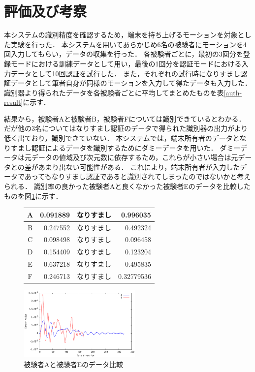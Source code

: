 \section{評価及び考察}
本システムの識別精度を確認するため，端末を持ち上げるモーションを対象とした実験を行った．
本システムを用いてあらかじめ6名の被験者にモーションを4回入力してもらい，データの収集を行った．
各被験者ごとに，最初の3回分を登録モードにおける訓練データとして用い，最後の1回分を認証モードにおける入力データとして10回認証を試行した．
また，それぞれの試行時になりすまし認証データとして筆者自身が同様のモーションを入力して得たデータも入力した．
識別器より得られたデータを各被験者ごとに平均してまとめたものを表\ref{auth-result}に示す．

結果から，被験者Aと被験者B，被験者Fについては識別できているとわかる．
だが他の3名についてはなりすまし認証のデータで得られた識別器の出力がより低く出ており，識別できていない．
本システムでは，端末所有者のデータとなりすまし認証によるデータを識別するためにダミーデータを用いた．
ダミーデータは元データの値域及び次元数に依存するため，これらが小さい場合は元データとの差があまり出ない可能性がある．
これにより，端末所有者が入力したデータであってもなりすまし認証であると識別されてしまったのではないかと考えられる．
識別率の良かった被験者Aと良くなかった被験者Eのデータを比較したものを図\ref{compare}に示す．

\begin{figure}[!tb]
  \def\@captype{table}
  \begin{minipage}{.48\textwidth}
    \centering
    \label{auth-result}
    \begin{tabular}{|c|r||c|r|} \hline
      A & 0.091889 & なりすまし & 0.996035 \\ \hline
      B & 0.247552 & なりすまし & 0.492324 \\ \hline
      C & 0.098498 & なりすまし & 0.096458 \\ \hline
      D & 0.154409 & なりすまし & 0.123204 \\ \hline
      E & 0.637218 & なりすまし & 0.495835 \\ \hline
      F & 0.246713 & なりすまし & 0.32779536 \\ \hline
    \end{tabular}
  \end{minipage}
  \hfill
  \begin{minipage}{.48\textwidth}
    \centering
    \includegraphics[bb=0 0 360 216, width=6cm]{Graphs/comp.pdf}
    \caption{被験者Aと被験者Eのデータ比較}
    \label{compare}
  \end{minipage}
\end{figure}
